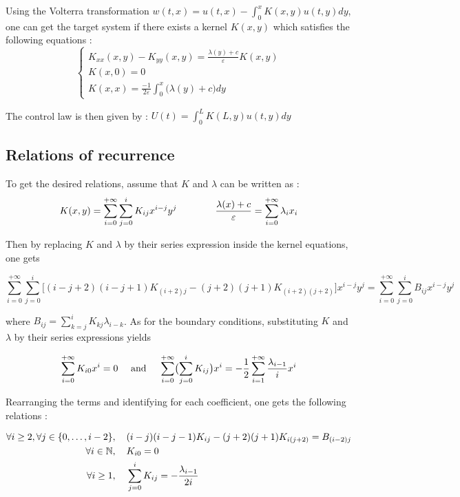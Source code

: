 \documentclass[11pt,a4paper]{article}
\newcommand{\N}{\mathbb{N}}
\newcommand{\eps}{\varepsilon}
\begin{document}
Using the Volterra transformation $w(t,x) = u(t,x) - \int_{0}^{x}K(x,y)u(t,y) dy$, one can get the target system if there exists a kernel $K(x,y)$ which satisfies the following equations : 
$$\begin{cases}
  K_{xx}(x,y) - K_{yy}(x,y) = \frac{\lambda(y)+c}{\eps}K(x,y) \\
  K(x,0) = 0 \\
  K(x,x) = \frac{-1}{2\eps}\int_{0}^{x} \bigl(\lambda(y) + c\bigr) dy 
\end{cases}$$

The control law is then given by : $U(t) = \int_{0}^{L} K(L,y)u(t,y) dy$

\subsection{Relations of recurrence}

To get the desired relations, assume that $K$ and $\lambda$ can be written as :
$$K(x,y) = \sum_{i=0}^{+\infty} \sum_{j=0}^i K_{ij}x^{i-j}y^j \text{\hspace{4em}} \frac{\lambda(x)+c}{\eps} = \sum_{i=0}^{+\infty}\lambda_i x_i$$

Then by replacing $K$ and $\lambda$ by their series expression inside the kernel equations, one gets

$$\sum_{i=0}^{+\infty}\sum_{j=0}^{i}\bigl[(i-j+2)(i-j+1)K_{(i+2)j} - (j+2)(j+1)K_{(i+2)(j+2)}\bigr]x^{i-j}y^j = \sum_{i=0}^{+\infty}\sum_{j=0}^{i}B_{ij}x^{i-j}y^j$$

where $B_{ij} = \sum_{k=j}^{i}K_{kj}\lambda_{i-k}$. As for the boundary conditions, substituting $K$ and $\lambda$ by their series expressions yields

$$
  \sum_{i=0}^{+\infty}K_{i0}x^i = 0 \text{\hspace{1em} and \hspace{1em}}
  \sum_{i=0}^{+\infty}\bigl(\sum_{j=0}^{i}K_{ij}\bigr)x^i = -\frac{1}{2}\sum_{i=1}^{+\infty}\frac{\lambda_{i-1}}{i}x^i
$$

Rearranging the terms and identifying for each coefficient, one gets the following relations : 

\begin{align}
  \forall i \geq 2, \forall j \in \left\{0, \dots, i-2\right\} &, \text{\hspace{1em}} (i-j)(i-j-1)K_{ij} - (j+2)(j+1)K_{i(j+2)} = B_{(i-2)j} \\
  \forall i \in \N&, \text{\hspace{1em}} K_{i0} =0 \\
  \forall i \geq 1&, \text{\hspace{1em}} \sum_{j=0}^{i}K_{ij} = -\frac{\lambda_{i-1}}{2i}
\end{align}
\end{document}
